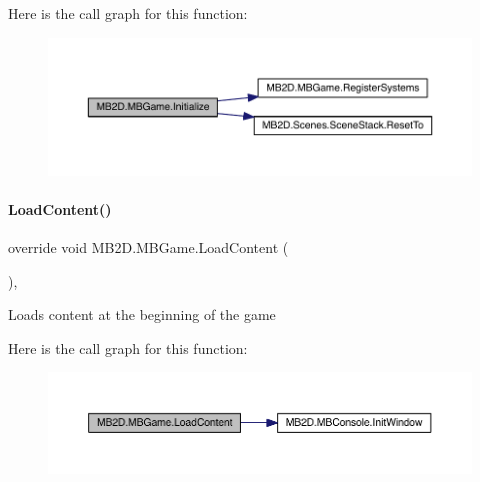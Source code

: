 Here is the call graph for this function\+:
\nopagebreak
\begin{figure}[H]
\begin{center}
\leavevmode
\includegraphics[width=350pt]{class_m_b2_d_1_1_m_b_game_a2157be479c1831c49301cd472cc01cde_cgraph}
\end{center}
\end{figure}
\hypertarget{class_m_b2_d_1_1_m_b_game_a64ee7de17491790b25b326a644789082}{}\label{class_m_b2_d_1_1_m_b_game_a64ee7de17491790b25b326a644789082} 
\paragraph{\texorpdfstring{Load\+Content()}{LoadContent()}}
{\footnotesize\ttfamily override void M\+B2\+D.\+M\+B\+Game.\+Load\+Content (\begin{DoxyParamCaption}{ }\end{DoxyParamCaption})\hspace{0.3cm}{\ttfamily [inline]}, {\ttfamily [protected]}}



Loads content at the beginning of the game 

Here is the call graph for this function\+:
\nopagebreak
\begin{figure}[H]
\begin{center}
\leavevmode
\includegraphics[width=350pt]{class_m_b2_d_1_1_m_b_game_a64ee7de17491790b25b326a644789082_cgraph}
\end{center}
\end{figure}
\hypertarget{class_m_b2_d_1_1_m_b_game_ad7e9a60dbaefe1416db0456b07b13487}{}\label{class_m_b2_d_1_1_m_b_game_ad7e9a60dbaefe1416db0456b07b13487} 
